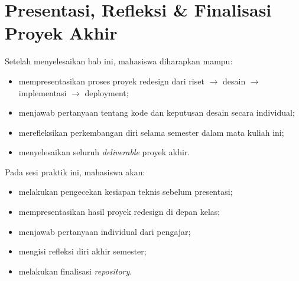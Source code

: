 
\chapter{Presentasi, Refleksi \& Finalisasi Proyek Akhir}
\label{chap:minggu-16}

\begin{capaian}
Setelah menyelesaikan bab ini, mahasiswa diharapkan mampu:
\begin{itemize}
  \item mempresentasikan proses proyek redesign dari riset $\rightarrow$ desain $\rightarrow$ implementasi $\rightarrow$ deployment;
  \item menjawab pertanyaan tentang kode dan keputusan desain secara individual;
  \item merefleksikan perkembangan diri selama semester dalam mata kuliah ini;
  \item menyelesaikan seluruh \emph{deliverable} proyek akhir.
\end{itemize}
\end{capaian}

\begin{tujuanpraktik}
Pada sesi praktik ini, mahasiswa akan:
\begin{itemize}
  \item melakukan pengecekan kesiapan teknis sebelum presentasi;
  \item mempresentasikan hasil proyek redesign di depan kelas;
  \item menjawab pertanyaan individual dari pengajar;
  \item mengisi refleksi diri akhir semester;
  \item melakukan finalisasi \emph{repository}.
\end{itemize}
\end{tujuanpraktik}

